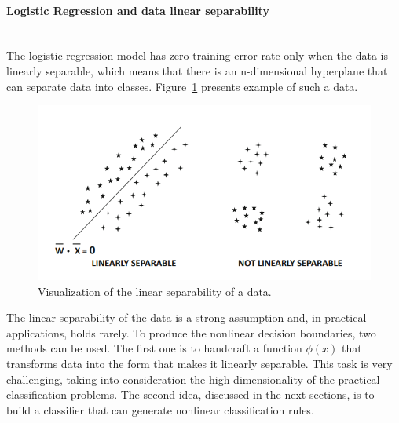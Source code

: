 \paragraph{Logistic Regression and data linear separability} \mbox{}
\\

The logistic regression model has zero training error rate only when the data is linearly separable, which means that there is an n-dimensional hyperplane that can separate data into classes. Figure~\ref{fig:linear separability} presents example of such a data.



\begin{figure}[!h]
\centering
\includegraphics{figures/limear_separability.PNG}
\caption{Visualization of the linear separability of a data.  
\label{fig:linear separability}}
\end{figure}


The linear separability of the data is a strong assumption and, in practical applications, holds rarely. To produce the nonlinear decision boundaries, two methods can be used. The first one is to handcraft a function $\phi(x)$ that transforms data into the form that makes it linearly separable. This task is very challenging, taking into consideration the high dimensionality of the practical classification problems. The second idea, discussed in the next sections, is to build a classifier that can generate nonlinear classification rules. 

